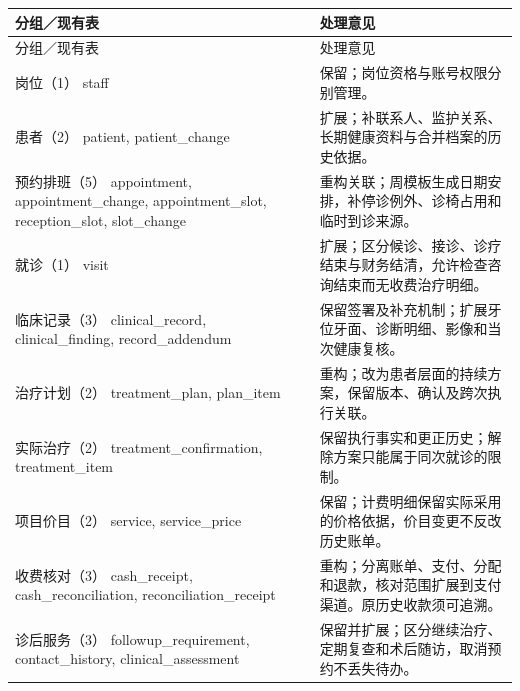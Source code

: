 \documentclass[UTF8,a4paper,zihao=-4,fontset=none]{ctexart}
\begin{document}
{\small
\begin{longtable}{@{}p{6.0cm}p{9.8cm}@{}}
\toprule
分组／现有表 & 处理意见 \\ \midrule
\endfirsthead
\toprule
分组／现有表 & 处理意见 \\ \midrule
\endhead
\raggedright\arraybackslash 岗位（1）
staff & \raggedright\arraybackslash 保留；岗位资格与账号权限分别管理。 \\[4pt]
\raggedright\arraybackslash 患者（2）
patient, patient\_\allowbreak{}change & \raggedright\arraybackslash 扩展；补联系人、监护关系、长期健康资料与合并档案的历史依据。 \\[4pt]
\raggedright\arraybackslash 预约排班（5）
appointment, appointment\_\allowbreak{}change, appointment\_\allowbreak{}slot, reception\_\allowbreak{}slot, slot\_\allowbreak{}change & \raggedright\arraybackslash 重构关联；周模板生成日期安排，补停诊例外、诊椅占用和临时到诊来源。 \\[4pt]
\raggedright\arraybackslash 就诊（1）
visit & \raggedright\arraybackslash 扩展；区分候诊、接诊、诊疗结束与财务结清，允许检查咨询结束而无收费治疗明细。 \\[4pt]
\raggedright\arraybackslash 临床记录（3）
clinical\_\allowbreak{}record, clinical\_\allowbreak{}finding, record\_\allowbreak{}addendum & \raggedright\arraybackslash 保留签署及补充机制；扩展牙位牙面、诊断明细、影像和当次健康复核。 \\[4pt]
\raggedright\arraybackslash 治疗计划（2）
treatment\_\allowbreak{}plan, plan\_\allowbreak{}item & \raggedright\arraybackslash 重构；改为患者层面的持续方案，保留版本、确认及跨次执行关联。 \\[4pt]
\raggedright\arraybackslash 实际治疗（2）
treatment\_\allowbreak{}confirmation, treatment\_\allowbreak{}item & \raggedright\arraybackslash 保留执行事实和更正历史；解除方案只能属于同次就诊的限制。 \\[4pt]
\raggedright\arraybackslash 项目价目（2）
service, service\_\allowbreak{}price & \raggedright\arraybackslash 保留；计费明细保留实际采用的价格依据，价目变更不反改历史账单。 \\[4pt]
\raggedright\arraybackslash 收费核对（3）
cash\_\allowbreak{}receipt, cash\_\allowbreak{}reconciliation, reconciliation\_\allowbreak{}receipt & \raggedright\arraybackslash 重构；分离账单、支付、分配和退款，核对范围扩展到支付渠道。原历史收款须可追溯。 \\[4pt]
\raggedright\arraybackslash 诊后服务（3）
followup\_\allowbreak{}requirement, contact\_\allowbreak{}history, clinical\_\allowbreak{}assessment & \raggedright\arraybackslash 保留并扩展；区分继续治疗、定期复查和术后随访，取消预约不丢失待办。 \\[4pt]

\end{longtable}}
\end{document}
